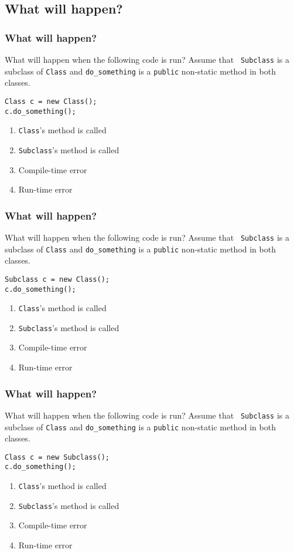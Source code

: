 \documentclass[9pt]{beamer}
\begin{document}
\subsection{What will happen?}
\begin{frame}[fragile]
  \frametitle{What will happen?}
  What will happen when the following code is run? Assume that {\tt
  Subclass} is a subclass of {\tt Class} and {\tt do\_something} is a
  {\tt public} non-static method in both classes.
  \begin{lstlisting}
Class c = new Class();
c.do_something();
  \end{lstlisting}
  \begin{enumerate}
    \item
      \alert<2>{{\tt Class}'s method is called}
    \item
      {\tt Subclass}'s method is called
    \item
      Compile-time error
    \item
      Run-time error
  \end{enumerate}
\end{frame}

\begin{frame}[fragile]
  \frametitle{What will happen?}
  What will happen when the following code is run? Assume that {\tt
  Subclass} is a subclass of {\tt Class} and {\tt do\_something} is a
  {\tt public} non-static method in both classes.
  \begin{lstlisting}
Subclass c = new Class();
c.do_something();
  \end{lstlisting}
  \begin{enumerate}
    \item
      {\tt Class}'s method is called
    \item
      {\tt Subclass}'s method is called
    \item
      \alert<2>{Compile-time error}
    \item
      Run-time error
  \end{enumerate}
\end{frame}

\begin{frame}[fragile]
  \frametitle{What will happen?}
  What will happen when the following code is run? Assume that {\tt
  Subclass} is a subclass of {\tt Class} and {\tt do\_something} is a
  {\tt public} non-static method in both classes.
  \begin{lstlisting}
Class c = new Subclass();
c.do_something();
  \end{lstlisting}
  \begin{enumerate}
    \item
      {\tt Class}'s method is called
    \item
      \alert<2>{{\tt Subclass}'s method is called}
    \item
      Compile-time error
    \item
      Run-time error
  \end{enumerate}
\end{frame}
\end{document}
